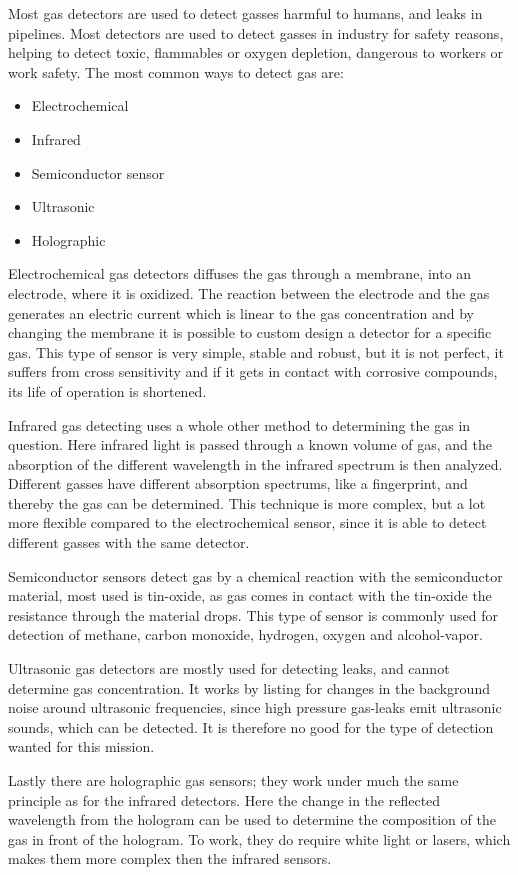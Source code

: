 Most gas detectors are used to detect gasses harmful to humans, and leaks in pipelines. Most detectors are used to detect gasses in industry for safety reasons, helping to detect toxic, flammables or oxygen depletion, dangerous to workers or work safety. The most common ways to detect gas are:
\begin{itemize}
  \item Electrochemical
  \item Infrared
  \item Semiconductor sensor
  \item Ultrasonic
  \item Holographic
\end{itemize}
Electrochemical gas detectors diffuses the gas through a membrane, into an electrode, where it is oxidized. The reaction between the electrode and the gas generates an electric current which is linear to the gas concentration and by changing the membrane it is possible to custom design a detector for a specific gas. This type of sensor is very simple, stable and robust, but it is not perfect, it suffers from cross sensitivity and if it gets in contact with corrosive compounds, its life of operation is shortened\cite{intlsensor}.

Infrared gas detecting uses a whole other method to determining the gas in question. Here infrared light is passed through a known volume of gas, and the absorption of the different wavelength in the infrared spectrum is then analyzed. Different gasses have different absorption spectrums, like a fingerprint, and thereby the gas can be determined. This technique is more complex, but a lot more flexible compared to the electrochemical sensor, since it is able to detect different gasses with the same detector\cite{ndir}.

Semiconductor sensors detect gas by a chemical reaction with the semiconductor material, most used is tin-oxide, as gas comes in contact with the tin-oxide the resistance through the material drops. This type of sensor is commonly used for detection of methane, carbon monoxide, hydrogen, oxygen and alcohol-vapor.

Ultrasonic gas detectors are mostly used for detecting leaks, and cannot determine gas concentration. It works by listing for changes in the background noise around ultrasonic frequencies, since high pressure gas-leaks emit ultrasonic sounds, which can be detected. It is therefore no good for the type of detection wanted for this mission.

Lastly there are holographic gas sensors; they work under much the same principle as for the infrared detectors. Here the change in the reflected wavelength from the hologram can be used to determine the composition of the gas in front of the hologram. To work, they do require white light or lasers, which makes them more complex then the infrared sensors.

